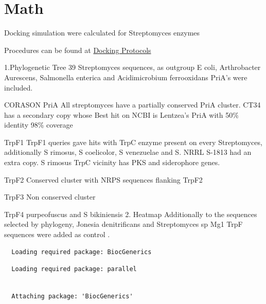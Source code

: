 \documentclass[12pt,twoside]{reedthesis}
\begin{document}
  \hypertarget{math}{\section{Math}\label{math}}
  
  Docking simulation were calculated for Streptomyces enzymes
  
  Procedures can be found at
  \href{https://github.com/tripplab/Docking/wiki}{Docking Protocols}
  
  1.Phylogenetic Tree 39 Streptomyces sequences, as outgroup E coli,
  Arthrobacter Aurescens, Salmonella enterica and Acidimicrobium
  ferrooxidans PriA's were included.
  
  CORASON PriA All streptomyces have a partially conserved PriA cluster.
  CT34 has a secondary copy whose Best hit on NCBI is Lentzea's PriA with
  50\% identity 98\% coverage
  
  TrpF1 TrpF1 queries gave hits with TrpC enzyme present on every
  Streptomyces, additionally S rimosus, S coelicolor, S venezuelae and S.
  NRRL S-1813 had an extra copy. S rimosus TrpC vicinity has PKS and
  siderophore genes.
  
  TrpF2 Conserved cluster with NRPS sequences flanking TrpF2
  
  TrpF3 Non conserved cluster
  
  TrpF4 purpeofuscus and S bikiniensis 2. Heatmap Additionally to the
  sequences selected by phylogeny, Jonesia denitrificans and Streptomyces
  sp Mg1 TrpF sequences were added as control .
  
  \begin{Shaded}
  \begin{Highlighting}[]
  \end{Highlighting}
  \end{Shaded}
  
  \begin{verbatim}
  Loading required package: BiocGenerics
  \end{verbatim}
  
  \begin{verbatim}
  Loading required package: parallel
  \end{verbatim}
  
  \begin{verbatim}
  
  Attaching package: 'BiocGenerics'
  \end{verbatim}
  
\end{document}
